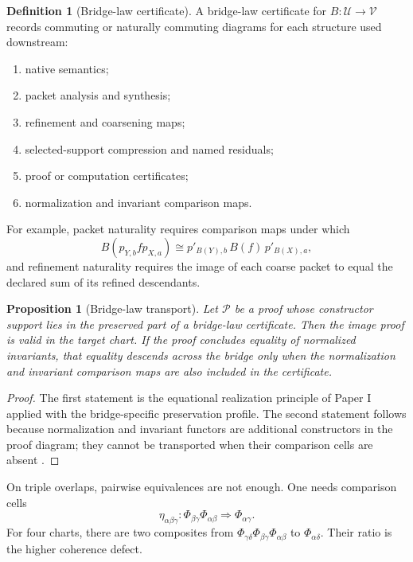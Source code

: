 \documentclass[11pt]{article}
\newtheorem{proposition}[theorem]{Proposition}
\theoremstyle{definition}
\newtheorem{definition}[theorem]{Definition}
\theoremstyle{remark}
\begin{document}
\begin{definition}[Bridge-law certificate]
\label{def:bridge-law-certificate}
A bridge-law certificate for \(B:\mathcal U\to\mathcal V\) records commuting or naturally commuting diagrams for each structure used downstream:
\begin{enumerate}[label=\textup{(\roman*)}]
\item native semantics;
\item packet analysis and synthesis;
\item refinement and coarsening maps;
\item selected-support compression and named residuals;
\item proof or computation certificates;
\item normalization and invariant comparison maps.
\end{enumerate}
For example, packet naturality requires comparison maps under which
\[
B(p_{Y,b}fp_{X,a})
\cong
p'_{B(Y),b}\,B(f)\,p'_{B(X),a},
\]
and refinement naturality requires the image of each coarse packet to equal the declared sum of its refined descendants.
\end{definition}

\begin{proposition}[Bridge-law transport]
\label{prop:bridge-law-transport}
Let \(\mathcal P\) be a proof whose constructor support lies in the preserved part of a bridge-law certificate.  Then the image proof is valid in the target chart.  If the proof concludes equality of normalized invariants, that equality descends across the bridge only when the normalization and invariant comparison maps are also included in the certificate.
\end{proposition}

\begin{proof}
The first statement is the equational realization principle of Paper I applied with the bridge-specific preservation profile.  The second statement follows because normalization and invariant functors are additional constructors in the proof diagram; they cannot be transported when their comparison cells are absent \cite{P1}.
\end{proof}

On triple overlaps, pairwise equivalences are not enough.  One needs comparison cells
\[
\eta_{\alpha\beta\gamma}:
\Phi_{\beta\gamma}\Phi_{\alpha\beta}
\Longrightarrow
\Phi_{\alpha\gamma}.
\]
For four charts, there are two composites from
\(
\Phi_{\gamma\delta}\Phi_{\beta\gamma}\Phi_{\alpha\beta}
\)
to \(\Phi_{\alpha\delta}\).  Their ratio is the higher coherence defect.
\end{document}
